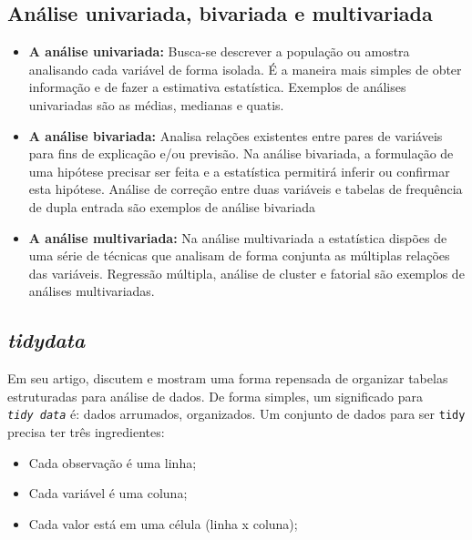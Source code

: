 \documentclass[11pt,]{style/krantz}
\providecommand{\tightlist}{%
  \setlength{\itemsep}{0pt}\setlength{\parskip}{0pt}}
\theoremstyle{definition}
\theoremstyle{definition}
\theoremstyle{definition}
\theoremstyle{remark}
\begin{document}
\hypertarget{analise-univariada-bivariada-e-multivariada}{%
\subsection{Análise univariada, bivariada e multivariada}\label{analise-univariada-bivariada-e-multivariada}}

\begin{itemize}
\item
  \textbf{A análise univariada:} Busca-se descrever a população ou amostra analisando cada variável de forma isolada. É a maneira mais simples de obter informação e de fazer a estimativa estatística. Exemplos de análises univariadas são as médias, medianas e quatis.
\item
  \textbf{A análise bivariada:} Analisa relações existentes entre pares de variáveis para fins de explicação e/ou previsão. Na análise bivariada, a formulação de uma hipótese precisar ser feita e a estatística permitirá inferir ou confirmar esta hipótese. Análise de correção entre duas variáveis e tabelas de frequência de dupla entrada são exemplos de análise bivariada
\item
  \textbf{A análise multivariada:} Na análise multivariada a estatística dispões de uma série de técnicas que analisam de forma conjunta as múltiplas relações das variáveis. Regressão múltipla, análise de cluster e fatorial são exemplos de análises multivariadas.
\end{itemize}

\hypertarget{tidydata}{%
\subsection{\texorpdfstring{\emph{tidydata}}{tidydata}}\label{tidydata}}

Em seu artigo, \citep{wickham2014tidy} discutem e mostram uma forma repensada de organizar tabelas estruturadas para análise de dados. De forma simples, um significado para \emph{\texttt{tidy\ data}} é: dados arrumados, organizados.
Um conjunto de dados para ser \texttt{tidy} precisa ter três ingredientes:

\begin{itemize}
\tightlist
\item
  Cada observação é uma linha;
\item
  Cada variável é uma coluna;\\
\item
  Cada valor está em uma célula (linha x coluna);
\end{itemize}
\end{document}
